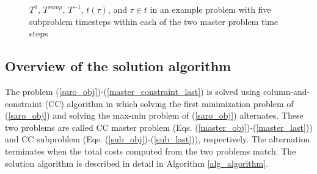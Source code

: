 \documentclass[final]{IEEEtran}
\begin{document}
\begin{figure}[htpb]
	\caption{$T^0$, $T^{ramp}$, $T^{-1}$, $t(\tau)$, and $\tau \in t$ in an example problem with five subproblem timesteps within each of the two master problem time steps}
	\label{fig_time_scales}
\end{figure}

\subsection{Overview of the solution algorithm}

The problem (\ref{saro_obj})-(\ref{master_constraint_last}) is solved using column-and-constraint (CC) algorithm in which solving the first minimization problem of (\ref{saro_obj}) and solving the max-min problem of (\ref{saro_obj}) alternates. These two problems are called CC master problem (Eqs. (\ref{master_obj})-(\ref{master_last})) and CC subproblem (Eqs. (\ref{sub_obj})-(\ref{sub_last})), respectively. The alternation terminates when the total costs computed from the two problems match. The solution algorithm is described in detail in Algorithm \ref{alg_algorithm}.
\end{document}
